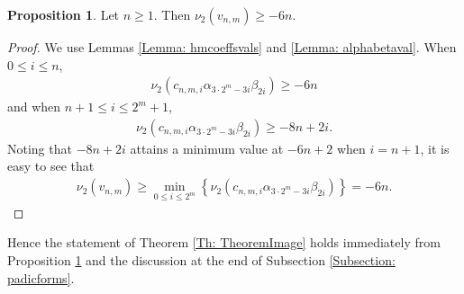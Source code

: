 \documentclass[10pt,a4paper]{amsart}
\numberwithin{equation}{section}
\theoremstyle{definition}
\newtheorem{Prop}[Th]{Proposition}
\begin{document}
\begin{Prop} \label{Prop: overconvergent}
    Let $n \geq 1$. Then $\nu_{2}\left( v_{n,m} \right) \geq -6n$.
\end{Prop}
\begin{proof}
    We use Lemmas \ref{Lemma: hmcoeffsvals} and \ref{Lemma: alphabetaval}. When $0 \leq i \leq n$,
    \begin{align*}
        \nu_{2}\left( c_{n,m,i} \alpha_{3 \cdot 2^{m}-3i}\beta_{2i} \right) \geq -6n
    \end{align*}
    and when $n+1 \leq i \leq 2^{m}+1$,
    \begin{align*}
        \nu_{2}\left( c_{n,m,i} \alpha_{3 \cdot 2^{m}-3i}\beta_{2i} \right) \geq -8n+2i. 
    \end{align*}
    Noting that $-8n+2i$ attains a minimum value at $-6n+2$ when $i=n+1$, it is easy to see that
    \begin{align*}
        \nu_{2}\left( v_{n,m} \right) \geq \min_{0 \leq i \leq 2^{m}} \left\lbrace \nu_{2} \left( c_{n,m,i}\alpha_{3 \cdot 2^{m}-3i}\beta_{2i} \right) \right\rbrace = -6n.
    \end{align*}
\end{proof}

Hence the statement of Theorem \ref{Th: TheoremImage} holds immediately from Proposition \ref{Prop: overconvergent} and the discussion at the end of Subsection \ref{Subsection: padicforms}.






\end{document}
